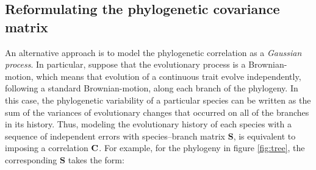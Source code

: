 \documentclass[12pt]{article}
\begin{document}

\subsection*{Reformulating the phylogenetic covariance matrix}


\newcommand{\bS}{{\mathbf S}}
\newcommand{\bJ}{{\mathbf J}}
\newcommand{\bB}{{\mathbf B}}
\newcommand{\bBadj}{{\mathbf B}_{\mbox{\tiny adj}}}
\newcommand{\bomega}{{\boldsymbol \omega}}
\newcommand{\bell}{{\boldsymbol \ell}}
\newcommand{\e}{{ \epsilon}}

An alternative approach is to model the phylogenetic correlation as a \textit{Gaussian process}. 
In particular, suppose that the evolutionary process is a Brownian-motion, which means that evolution of a continuous trait evolve independently, following a standard Brownian-motion, along each branch of the phylogeny.
In this case, the phylogenetic variability of a particular species can be written as the sum of the variances of evolutionary changes that occurred on all of the branches in its history. 
Thus, modeling the evolutionary history of each species with a sequence of independent errors with species--branch matrix $\bS$, is equivalent to imposing a correlation ${\mathbf C}$.
For example, for the phylogeny in figure \ref{fig:tree}, the corresponding $\bS$ takes the form:
\end{document}
